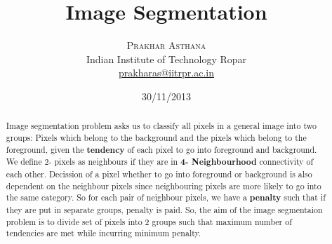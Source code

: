\documentclass[twoside]{article}
\title{\vspace{-15mm}\fontsize{24pt}{10pt}\selectfont\textbf{Image Segmentation}} %
\author{
\large
\textsc{Prakhar Asthana}\\[2mm] %
\normalsize Indian Institute of Technology Ropar \\ %
\normalsize \href{mailto:prakharas@iitrpr.ac.in}{prakharas@iitrpr.ac.in} %
\vspace{1mm}
}
\date{30/11/2013}
\begin{document}
\maketitle %

\thispagestyle{fancy} %


\begin{abstract}
\noindent 
Image segmentation problem asks us to classify all pixels in a general image into two groups: Pixels which belong to the background and the pixels which belong to the foreground, given the \textbf{tendency} of each pixel to go into foreground and background. We define 2- pixels as neighbours if they are in \textbf{4- Neighbourhood} connectivity of each other. Decission of a pixel whether to go into foreground or background is also dependent on the neighbour pixels since neighbouring pixels are more likely to go into the same category. So for each pair of neighbour pixels, we have a \textbf{penalty} such that if they are put in separate groups, penalty is paid. So, the aim of the image segmentaion problem is to divide set of pixels into 2 groups such that maximum number of tendencies are met while incurring minimum penalty. 
\end{abstract}


\end{document}
